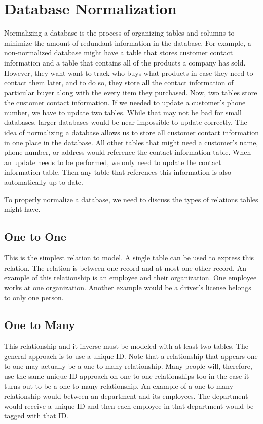 \renewcommand{\lsql}[1]{\lstinline[language=SQL,prebreak=]!#1!}

\label{lab:advancedsql}

\section*{Database Normalization}
Normalizing a database is the process of organizing tables and columns to minimize the amount of redundant information in the database.
For example, a non-normalized database might have a table that stores customer contact information and a table that contains all of the products a company has sold.
However, they want want to track who buys what products in case they need to contact them later, and to do so, they store all the contact information of particular buyer along with the every item they purchased.
Now, two tables store the customer contact information.
If we needed to update a customer's phone number, we have to update two tables.
While that may not be bad for small databases, larger databases would be near impossible to update correctly.
The idea of normalizing a database allows us to store all customer contact information in one place in the database.
All other tables that might need a customer's name, phone number, or address would reference the contact information table.
When an update needs to be performed, we only need to update the contact information table.
Then any table that references this information is also automatically up to date.

To properly normalize a database, we need to discuss the types of relations tables might have.
\subsection*{One to One}
This is the simplest relation to model.
A single table can be used to express this relation.
The relation is between one record and at most one other record.
An example of this relationship is an employee and their organization.
One employee works at one organization.
Another example would be a driver's license belongs to only one person.

\subsection*{One to Many}
This relationship and it inverse must be modeled with at least two tables.
The general approach is to use a unique ID.
Note that a relationship that appears one to one may actually be a one to many relationship.
Many people will, therefore, use the same unique ID approach on one to one relationships too in the case it turns out to be a one to many relationship.
An example of a one to many relationship would between an department and its employees.
The department would receive a unique ID and then each employee in that department would be tagged with that ID.


